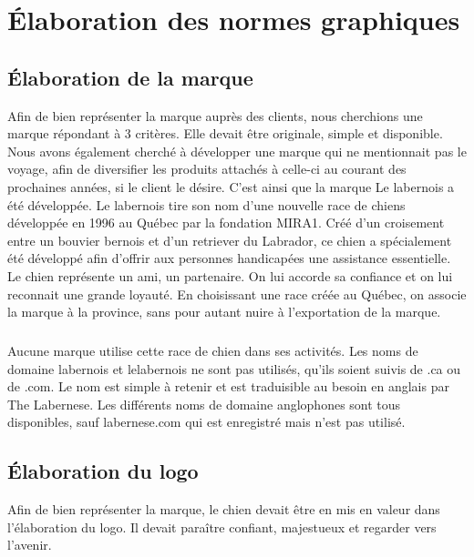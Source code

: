 \documentclass{scrreprt}
\begin{document}
\chapter{Élaboration des normes graphiques}

\section{Élaboration de la marque}
Afin de bien représenter la marque auprès des clients, nous cherchions une
marque répondant à 3 critères. Elle devait être originale, simple et
disponible. Nous avons également cherché à développer une marque qui ne
mentionnait pas le voyage, afin de diversifier les produits attachés à celle-ci
au courant des prochaines années, si le client le désire.
C’est ainsi que la marque Le labernois a été développée.
Le labernois tire son nom d’une nouvelle race de chiens développée en 1996 au
Québec par la fondation MIRA1. Créé d’un croisement entre un bouvier bernois et
d’un retriever du Labrador, ce chien a spécialement été développé afin d’offrir
aux personnes handicapées une assistance essentielle.
Le chien représente un ami, un partenaire. On lui accorde sa confiance et on
lui reconnait une grande loyauté. En choisissant une race créée au Québec, on
associe la marque à la province, sans pour autant nuire à l’exportation de la
marque.

\paragraph{}
Aucune marque utilise cette race de chien dans ses activités. Les noms de
domaine labernois et lelabernois ne sont pas utilisés, qu’ils soient suivis de
.ca ou de .com. Le nom est simple à retenir et est traduisible au besoin en
anglais par The Labernese. Les différents noms de domaine anglophones sont tous
disponibles, sauf labernese.com qui est enregistré mais n’est pas utilisé.

\newpage

\section{Élaboration du logo}
Afin de bien représenter la marque, le chien devait être en mis en valeur dans
l’élaboration du logo. Il devait paraître confiant, majestueux et regarder vers
l’avenir.
\end{document}
